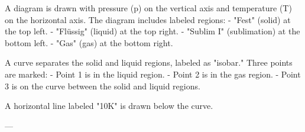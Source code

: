 A diagram is drawn with pressure (p) on the vertical axis and temperature (T) on the horizontal axis. The diagram includes labeled regions:  
- "Fest" (solid) at the top left.  
- "Flüssig" (liquid) at the top right.  
- "Sublim I" (sublimation) at the bottom left.  
- "Gas" (gas) at the bottom right.  

A curve separates the solid and liquid regions, labeled as "isobar." Three points are marked:  
- Point 1 is in the liquid region.  
- Point 2 is in the gas region.  
- Point 3 is on the curve between the solid and liquid regions.  

A horizontal line labeled "10K" is drawn below the curve.  

---